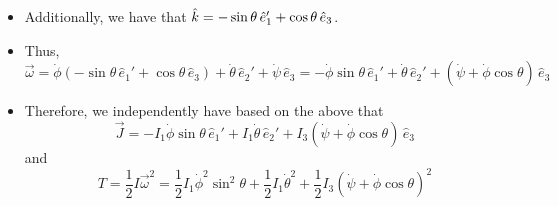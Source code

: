 \documentclass[../notes.tex]{subfiles}
\begin{document}
\begin{itemize}
\begin{itemize}
        \item Additionally, we have that $\hat{k}=-\sin\theta\,\hat{e}_1'+\cos\theta\,\hat{e}_3$.
        \item Thus,
        \begin{equation*}
            \vec{\omega} = \dot{\phi}(-\sin\theta\,\hat{e}_1'+\cos\theta\,\hat{e}_3)+\dot{\theta}\,\hat{e}_2'+\dot{\psi}\,\hat{e}_3
            = -\dot{\phi}\sin\theta\,\hat{e}_1'+\dot{\theta}\,\hat{e}_2'+(\dot{\psi}+\dot{\phi}\cos\theta)\,\hat{e}_3
        \end{equation*}
        \item Therefore, we independently have based on the above that
        \begin{equation*}
            \vec{J} = -I_1\dot{\phi}\sin\theta\,\hat{e}_1'+I_1\dot{\theta}\,\hat{e}_2'+I_3(\dot{\psi}+\dot{\phi}\cos\theta)\,\hat{e}_3
        \end{equation*}
        and
        \begin{equation*}
            T = \frac{1}{2}I\vec{\omega}^2
            = \frac{1}{2}I_1\dot{\phi}^2\sin^2\theta+\frac{1}{2}I_1\dot{\theta}^2+\frac{1}{2}I_3(\dot{\psi}+\dot{\phi}\cos\theta)^2
        \end{equation*}
    \end{itemize}
\end{itemize}
\end{document}
